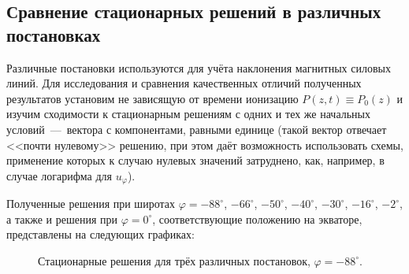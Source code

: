 \documentclass[14pt, a4paper, fleqn]{extarticle}
\begin{document}
\subsection{Сравнение стационарных решений в различных постановках}


Различные постановки используются для учёта наклонения магнитных силовых линий. Для исследования и сравнения качественных отличий полученных результатов установим не зависящую от времени ионизацию $P(z, t) \equiv P_0(z)$ и изучим сходимости к стационарным решениям с одних и тех же начальных условий~---~вектора с компонентами, равными единице (такой вектор отвечает <<почти нулевому>> решению, при этом даёт возможность использовать схемы, применение которых к случаю нулевых значений затруднено, как, например, в случае логарифма для $u_\varphi$). 

Полученные решения при широтах $\varphi = -88^\circ$, $-66^\circ$, $-50^\circ$, $-40^\circ$, $-30^\circ$, $-16^\circ$, $-2^\circ$, а также и решения при $\varphi = 0^\circ$, соответствующие положению на экваторе, представлены на следующих графиках:

\begin{figure}[H]
\caption{Стационарные решения для трёх различных постановок, $\varphi = -88^\circ$.}
\end{figure}
\end{document}
